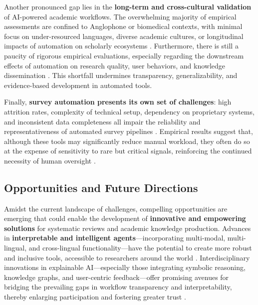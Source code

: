 \documentclass[sigconf]{acmart}
\begin{document}
Another pronounced gap lies in the \textbf{long-term and cross-cultural validation} of AI-powered academic workflows. The overwhelming majority of empirical assessments are confined to Anglophone or biomedical contexts, with minimal focus on under-resourced languages, diverse academic cultures, or longitudinal impacts of automation on scholarly ecosystems \cite{ref110,ref117}. Furthermore, there is still a paucity of rigorous empirical evaluations, especially regarding the downstream effects of automation on research quality, user behaviors, and knowledge dissemination \cite{ref73,ref110,ref117}. This shortfall undermines transparency, generalizability, and evidence-based development in automated tools.

Finally, \textbf{survey automation presents its own set of challenges}: high attrition rates, complexity of technical setup, dependency on proprietary systems, and inconsistent data completeness all impair the reliability and representativeness of automated survey pipelines \cite{ref81,ref117}. Empirical results suggest that, although these tools may significantly reduce manual workload, they often do so at the expense of sensitivity to rare but critical signals, reinforcing the continued necessity of human oversight \cite{ref110,ref117}.

\subsection{Opportunities and Future Directions}

Amidst the current landscape of challenges, compelling opportunities are emerging that could enable the development of \textbf{innovative and empowering solutions} for systematic reviews and academic knowledge production. Advances in \textbf{interpretable and intelligent agents}—incorporating multi-modal, multi-lingual, and cross-lingual functionality—have the potential to create more robust and inclusive tools, accessible to researchers around the world \cite{ref38,ref41,ref61,ref62,ref63,ref64,ref68,ref70,ref76,ref78,ref80,ref81,ref82,ref84,ref86,ref87,ref88,ref89,ref90,ref91,ref92,ref93,ref94,ref95,ref99,ref100,ref102,ref103,ref104,ref105,ref108,ref109,ref110,ref111,ref112,ref113,ref114,ref115,ref117}. Interdisciplinary innovations in explainable AI—especially those integrating symbolic reasoning, knowledge graphs, and user-centric feedback—offer promising avenues for bridging the prevailing gaps in workflow transparency and interpretability, thereby enlarging participation and fostering greater trust \cite{ref61,ref68,ref70,ref76,ref87,ref88,ref89,ref90,ref94,ref104,ref105,ref108,ref110,ref111,ref113,ref114,ref117}.
\end{document}
